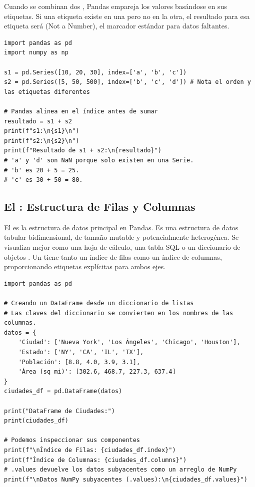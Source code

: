 \begin{example}
Cuando se combinan dos , Pandas empareja los valores basándose en sus etiquetas. Si una etiqueta existe en una  pero no en la otra, el resultado para esa etiqueta será  (Not a Number), el marcador estándar para datos faltantes.
\text{ }\begin{verbatim}
import pandas as pd
import numpy as np

s1 = pd.Series([10, 20, 30], index=['a', 'b', 'c'])
s2 = pd.Series([5, 50, 500], index=['b', 'c', 'd']) # Nota el orden y las etiquetas diferentes

# Pandas alinea en el índice antes de sumar
resultado = s1 + s2
print(f"s1:\n{s1}\n")
print(f"s2:\n{s2}\n")
print(f"Resultado de s1 + s2:\n{resultado}")
# 'a' y 'd' son NaN porque solo existen en una Serie.
# 'b' es 20 + 5 = 25.
# 'c' es 30 + 50 = 80.
\end{verbatim}
\end{example}

\subsection{El : Estructura de Filas y Columnas}
\label{subsec:pandas_dataframe}
El  es la estructura de datos principal en Pandas. Es una estructura de datos tabular bidimensional, de tamaño mutable y potencialmente heterogénea. Se visualiza mejor como una hoja de cálculo, una tabla SQL o un diccionario de objetos . Un  tiene tanto un índice de filas como un índice de columnas, proporcionando etiquetas explícitas para ambos ejes.

\text{ }\begin{verbatim}
import pandas as pd

# Creando un DataFrame desde un diccionario de listas
# Las claves del diccionario se convierten en los nombres de las columnas.
datos = {
    'Ciudad': ['Nueva York', 'Los Ángeles', 'Chicago', 'Houston'],
    'Estado': ['NY', 'CA', 'IL', 'TX'],
    'Población': [8.8, 4.0, 3.9, 3.1],
    'Área (sq mi)': [302.6, 468.7, 227.3, 637.4]
}
ciudades_df = pd.DataFrame(datos)

print("DataFrame de Ciudades:")
print(ciudades_df)

# Podemos inspeccionar sus componentes
print(f"\nÍndice de Filas: {ciudades_df.index}")
print(f"Índice de Columnas: {ciudades_df.columns}")
# .values devuelve los datos subyacentes como un arreglo de NumPy
print(f"\nDatos NumPy subyacentes (.values):\n{ciudades_df.values}")
\end{verbatim}

